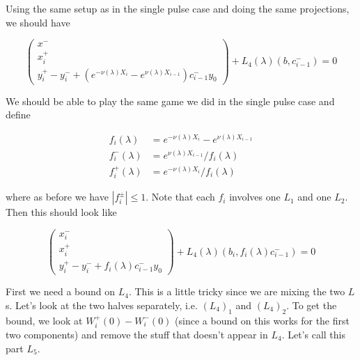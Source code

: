 \documentclass[12pt]{article}
\begin{document}
\begin{enumerate}
Using the same setup as in the single pulse case and doing the same projections, we should have

\[
\begin{pmatrix}x^- \\ x_i^+ \\ y_i^+ - y_i^- + (e^{-\nu(\lambda)X_i} - e^{\nu(\lambda)X_{i-1}}) c_{i-1}^- y_0 \end{pmatrix} + L_4(\lambda)(b, c_{i-1}^-) = 0
\]

We should be able to play the same game we did in the single pulse case and define

\begin{align*}
f_i(\lambda) &= e^{-\nu(\lambda)X_i} - e^{\nu(\lambda)X_{i-1}}  \\
f_i^-(\lambda) &= e^{\nu(\lambda)X_{i-1}} / f_i(\lambda) \\
f_i^+(\lambda) &= e^{-\nu(\lambda)X_{i}} / f_i(\lambda)
\end{align*}

where as before we have $|f_i^\pm| \leq 1$. Note that each $f_i$ involves one $L_1$ and one $L_2$. Then this should look like

\[
\begin{pmatrix}x_i^- \\ x_i^+ \\ y_i^+ - y_i^- + f_i(\lambda) c_{i-1}^- y_0 \end{pmatrix} + L_4(\lambda)(b_i, f_i(\lambda) c_{i-1}^-) = 0
\]

First we need a bound on $L_4$. This is a little tricky since we are mixing the two $L$s. Let's look at the two halves separately, i.e. $(L_4)_1$ and $(L_4)_2$. To get the bound, we look at $W_i^+(0) - W_i^-(0)$ (since a bound on this works for the first two components) and remove the stuff that doesn't appear in $L_4$. Let's call this part $L_5$.


\end{enumerate}
\end{document}
